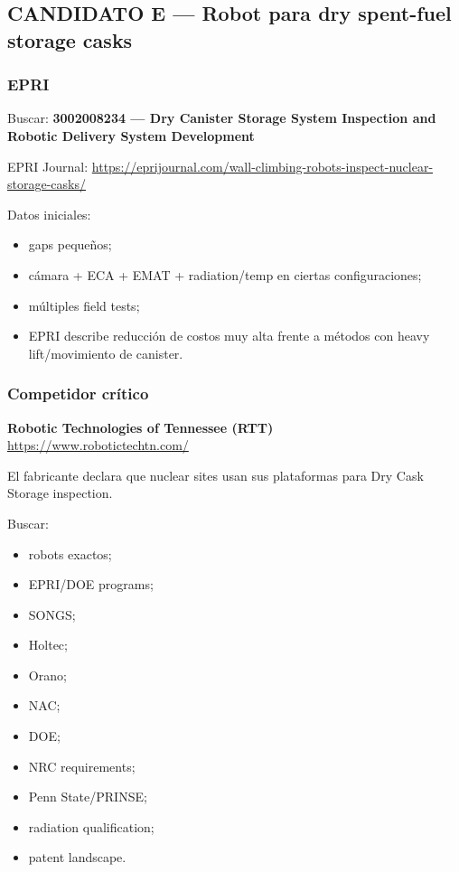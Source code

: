 \documentclass[11pt,a4paper]{article}
\begin{document}
\subsection*{CANDIDATO E — Robot para dry spent-fuel storage casks}

\subsubsection*{EPRI}
Buscar:
\textbf{3002008234 — Dry Canister Storage System Inspection and Robotic Delivery System Development}

EPRI Journal:
\url{https://eprijournal.com/wall-climbing-robots-inspect-nuclear-storage-casks/}

Datos iniciales:

\begin{itemize}
\item gaps pequeños;
\item cámara + ECA + EMAT + radiation/temp en ciertas configuraciones;
\item múltiples field tests;
\item EPRI describe reducción de costos muy alta frente a métodos con heavy lift/movimiento de canister.
\end{itemize}


\subsubsection*{Competidor crítico}
\textbf{Robotic Technologies of Tennessee (RTT)} \\
\url{https://www.robotictechtn.com/}

El fabricante declara que nuclear sites usan sus plataformas para Dry Cask Storage inspection.

Buscar:

\begin{itemize}
\item robots exactos;
\item EPRI/DOE programs;
\item SONGS;
\item Holtec;
\item Orano;
\item NAC;
\item DOE;
\item NRC requirements;
\item Penn State/PRINSE;
\item radiation qualification;
\item patent landscape.
\end{itemize}
\end{document}
